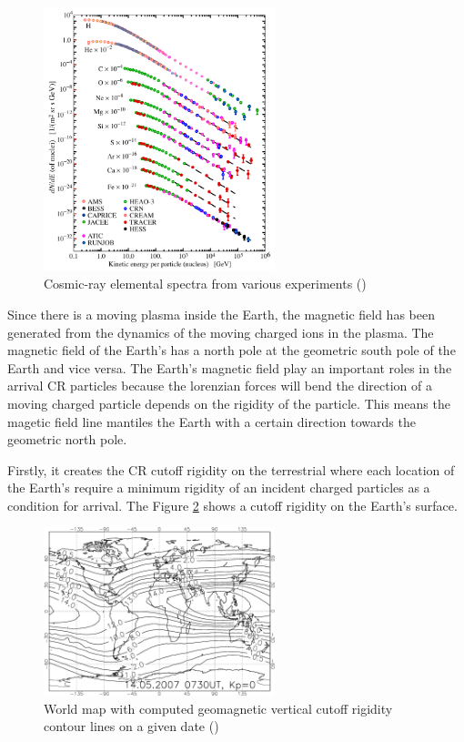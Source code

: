 \begin{figure}[h]
    \centering
    \includegraphics[width=0.6\textwidth]{content/literature_review/figures/cr_composition.png}
    \caption{Cosmic-ray elemental spectra from various experiments (\cite{review_particle_physics2012})}
    \label{fig:cr_composition}
\end{figure}


Since there is a moving plasma inside the Earth, the magnetic field 
has been generated from the dynamics of the moving charged ions in 
the plasma. The magnetic field of the Earth's has a north pole at 
the geometric south pole of the Earth and vice versa. 
The Earth's magnetic field play
an important roles in the arrival CR particles because the lorenzian 
forces will bend the direction of a moving charged particle depends 
on the rigidity of the particle.
This means the magetic field line mantiles the Earth with a
certain direction towards the geometric north pole.

Firstly, it creates the CR cutoff rigidity on the terrestrial
where each location of the Earth's require a minimum rigidity of 
an incident charged particles as a condition for arrival. The 
Figure \ref{fig:cr_map_rigidity} shows a cutoff rigidity on the Earth's surface.

\begin{figure}[h]
    \centering
    \includegraphics[width=0.6\textwidth]{content/literature_review/figures/map_cutoff_rigidity.png}
    \caption{ World map with computed geomagnetic vertical cutoff
        rigidity contour lines on a given date
        (\cite{map_cr_rigidity_cutoff})
    }
    \label{fig:cr_map_rigidity}
\end{figure}

